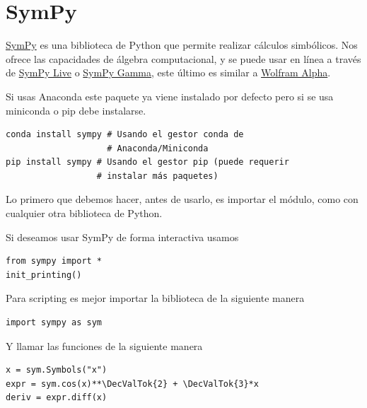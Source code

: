 \chapter{SymPy}

\href{https://es.wikipedia.org/wiki/SymPy}{SymPy} es una biblioteca de
Python que permite realizar cálculos simbólicos. Nos ofrece las
capacidades de álgebra computacional, y se puede usar en línea a través
de \href{http://live.sympy.org/}{SymPy Live} o
\href{http://www.sympygamma.com/}{SymPy Gamma}, este último es similar a
\href{https://www.wolframalpha.com/}{Wolfram Alpha}.

Si usas Anaconda este paquete ya viene instalado por defecto pero si se
usa miniconda o pip debe instalarse.

\begin{listing}[H]
\begin{verbatim}
conda install sympy # Usando el gestor conda de
                    # Anaconda/Miniconda
pip install sympy # Usando el gestor pip (puede requerir
                  # instalar más paquetes)
\end{verbatim}
\end{listing}

Lo primero que debemos hacer, antes de usarlo, es importar el módulo,
como con cualquier otra biblioteca de Python.

Si deseamos usar SymPy de forma interactiva usamos

\begin{listing}[H]
\begin{verbatim}
from sympy import *
init_printing()
\end{verbatim}
\end{listing}

Para scripting es mejor importar la biblioteca de la siguiente manera

\begin{listing}[H]
\begin{verbatim}
import sympy as sym
\end{verbatim}
\end{listing}

Y llamar las funciones de la siguiente manera

\begin{listing}[H]
\begin{verbatim}
x = sym.Symbols("x")
expr = sym.cos(x)**\DecValTok{2} + \DecValTok{3}*x
deriv = expr.diff(x)
\end{verbatim}
\end{listing}


